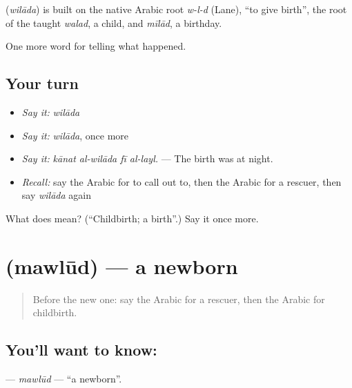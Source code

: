 \begin{cousinweb}
\textbf{} (\emph{wilāda}) is built on the native Arabic root \emph{w-l-d} (Lane), \textquotedblleft{}to give birth\textquotedblright{}, the root of the taught \emph{walad}, a child, and \emph{mīlād}, a birthday.
\end{cousinweb}

\begin{grammarlens}[title={What you've built}]
One more word for telling what happened.
\end{grammarlens}

\subsection*{Your turn}
\begin{itemize}
\raggedright
  \item \emph{Say it:} \emph{wilāda}
  \item \emph{Say it:} \emph{wilāda}, once more
  \item \emph{Say it:} \emph{kānat al-wilāda fī al-layl.} — The birth was at night.
  \item \emph{Recall:} say the Arabic for to call out to, then the Arabic for a rescuer, then say \emph{wilāda} again
\end{itemize}

\begin{tcolorbox}[breakable,colback=teal!4,colframe=teal!35!black,title={Before you move on}]
What does  mean? (\textquotedblleft{}Childbirth; a birth\textquotedblright{}.) Say it once more.
\end{tcolorbox}
\section[\texorpdfstring{\ar{مولود} (mawlūd)}{مولود (mawlūd)}]{ (mawlūd) — a newborn}

\label{lesson:AR-C311-mawlud}



\begin{quote}
Before the new one: say the Arabic for a rescuer, then the Arabic for childbirth.
\end{quote}

\subsection*{You'll want to know: }
\textbf{} — \emph{mawlūd} — \textquotedblleft{}a newborn\textquotedblright{}.

